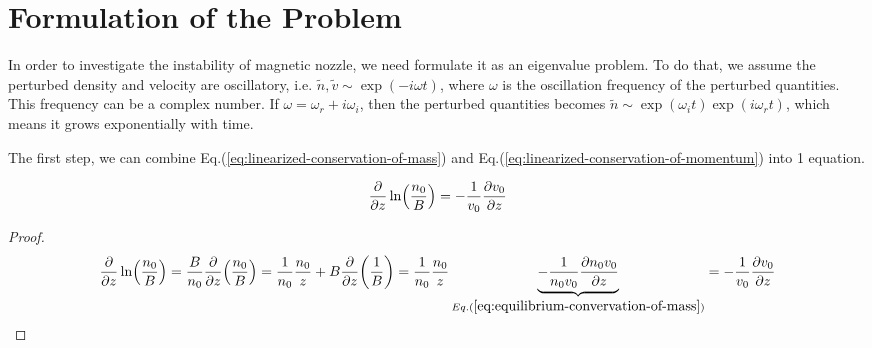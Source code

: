 \section{Formulation of the Problem}
In order to investigate the instability of magnetic nozzle, we need formulate it as an eigenvalue problem. To do that, we assume the perturbed density and velocity are oscillatory, i.e. $\tilde{n}, \tilde{v} \sim \exp(-i\omega t)$, where $\omega$ is the oscillation frequency of the perturbed quantities. This frequency can be a complex number. If $\omega = \omega_r +i \omega_i$, then the perturbed quantities becomes $\tilde{n} \sim \exp(\omega_i t)\exp(i\omega_r t)$, which means it grows exponentially with time.

The first step, we can combine Eq.(\ref{eq:linearized-conservation-of-mass}) and Eq.(\ref{eq:linearized-conservation-of-momentum}) into 1 equation.
\begin{proposition}
	\begin{equation}
		\pdv{z}\ln(\frac{n_0}{B}) = -\frac{1}{v_0}\pdv{v_0}{z}
		\label{eq:dv-ln}
	\end{equation}
\end{proposition}
\begin{proof}
	\[ \pdv{z}\ln(\frac{n_0}{B}) 
	= \frac{B}{n_0}\pdv{z}(\frac{n_0}{B})
	= \frac{1}{n_0}\frac{n_0}{z} + B\pdv{z}(\frac{1}{B})
	=
	\frac{1}{n_0}\frac{n_0}{z} \underbrace{- \frac{1}{n_0v_0}\pdv{n_0v_0}{z}}_{Eq.(\ref{eq:equilibrium-convervation-of-mass})}
	= -\frac{1}{v_0}\pdv{v_0}{z} \]
\end{proof}

